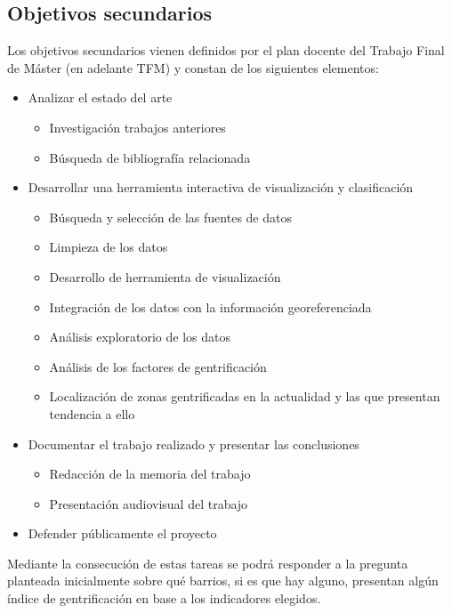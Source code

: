 \documentclass[12pt,a4paper,twoside]{book}
\begin{document}
\subsection{Objetivos secundarios}

Los objetivos secundarios vienen definidos por el plan docente del Trabajo Final de Máster (en adelante TFM) y constan de los siguientes elementos:

\begin{itemize}
    \item Analizar el estado del arte
    \begin{itemize}
        \item Investigación trabajos anteriores
        \item Búsqueda de bibliografía relacionada
    \end{itemize}
    \item Desarrollar una herramienta interactiva de visualización y clasificación
    \begin{itemize}
        \item Búsqueda y selección de las fuentes de datos
        \item Limpieza de los datos
        \item Desarrollo de herramienta de visualización
        \item Integración de los datos con la información georeferenciada
        \item Análisis exploratorio de los datos
        \item Análisis de los factores de gentrificación 
        \item Localización de zonas gentrificadas en la actualidad y las que presentan tendencia a ello
    \end{itemize}
    \item Documentar el trabajo realizado y presentar las conclusiones
    \begin{itemize}
        \item Redacción de la memoria del trabajo
        \item Presentación audiovisual del trabajo
    \end{itemize}
    \item Defender públicamente el proyecto
\end{itemize}

Mediante la consecución de estas tareas se podrá responder a la pregunta planteada inicialmente sobre qué barrios, si es que hay alguno, presentan algún índice de gentrificación en base a los indicadores elegidos.
\end{document}
